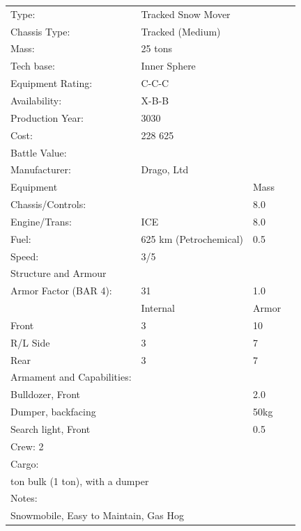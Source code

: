 \documentclass{tufte-book}
\begin{document}
\bigskip
\begin{minipage}{\textwidth}
\begin{center}
\begin{tabular}{llll}
\toprule
Type: & Tracked Snow Mover & \\
Chassis Type: & Tracked (Medium) & \\
Mass: & 25 tons & \\
Tech base: & Inner Sphere & \\
Equipment Rating: & C-C-C & \\
Availability: & X-B-B & \\
Production Year: & 3030 & \\
Cost: & 228 625 & \\
Battle Value: & & \\
Manufacturer: & Drago, Ltd & \\
Equipment & & Mass \\
\quad Chassis/Controls: & & 8.0 \\
\quad Engine/Trans: & ICE & 8.0 \\
\quad Fuel: & 625 km (Petrochemical) & 0.5 \\
\quad Speed: & \multicolumn{2}{l}{3/5} \\
Structure and Armour & & \\
\quad Armor Factor (BAR 4): & 31 & 1.0 \\
\quad & Internal & Armor \\
\quad Front & 3 & 10 \\
\quad R/L Side & 3 & 7 \\
\quad Rear & 3 & 7 \\

Armament and Capabilities: & & \\
\multicolumn{2}{l}{\quad Bulldozer, Front} & 2.0 \\
\multicolumn{2}{l}{\quad Dumper, backfacing} & 50kg \\
\multicolumn{2}{l}{\quad Search light, Front} & 0.5 \\

\multicolumn{3}{l}{Crew: 2} \\
Cargo: & & \\
\multicolumn{3}{l}{\quad 1 ton bulk (1 ton), with a dumper} \\

Notes: & & \\
\multicolumn{3}{l}{\quad Snowmobile, Easy to Maintain, Gas Hog} \\

\bottomrule
\end{tabular}
\end{center}
\end{minipage}
\end{document}
